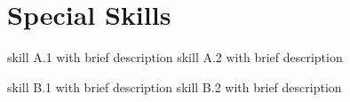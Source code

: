 \documentclass[english]{my_cv}
\begin{document}
\section{Special Skills}
\begin{description}[align=left, labelwidth=\cvcolumnwidth+0.5\tabcolsep, leftmargin=\cvcolumnwidth+2\tabcolsep, labelsep=1.5\tabcolsep, format={\color{leftcolumncolor}}]
    \begin{litemize}%
       skill A.1 with brief description
       skill A.2 with brief description
    \end{litemize}
    \begin{litemize}
       skill B.1 with brief description
       skill B.2 with brief description
    \end{litemize}
\end{description}
\end{document}

